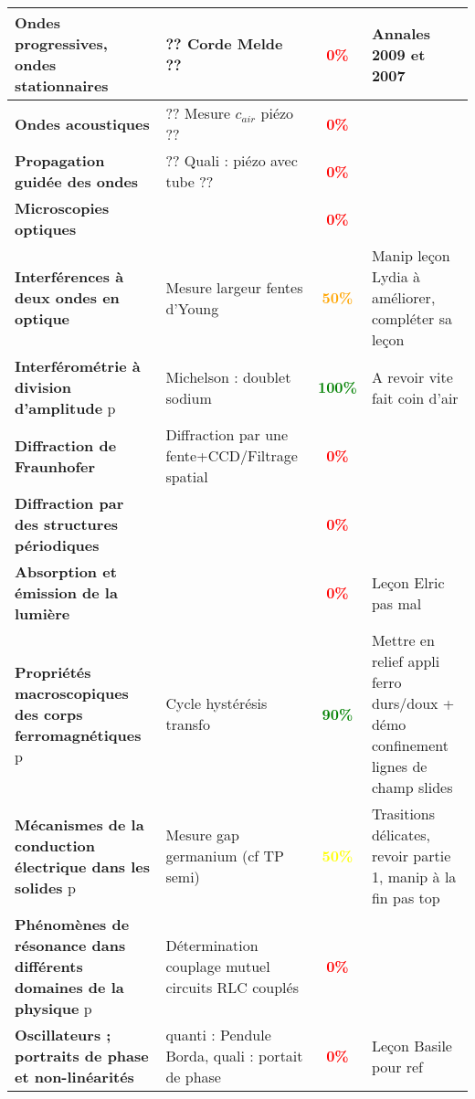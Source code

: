 \begin{changemargin}{-1.5cm}{-0cm}
\begin{center}
\begin{tabularx}{\paperwidth-2cm}{| X | X | c | X |}
\hline
  \textbf{Ondes progressives, ondes stationnaires} & ?? Corde Melde ?? & \textcolor{red}{\textbf{0\%}} & Annales 2009 et 2007 \\
  \hline
  \textbf{Ondes acoustiques} & ?? Mesure $c_{air}$ piézo ?? & \textcolor{red}{\textbf{0\%}} &  \\
  \hline
  \textbf{Propagation guidée des ondes} & ?? Quali : piézo avec tube  ?? & \textcolor{red}{\textbf{0\%}} & \\
  \hline
  \textbf{Microscopies optiques} & & \textcolor{red}{\textbf{0\%}} &  \\
  \hline
  \textbf{Interférences à deux ondes en optique} & Mesure largeur fentes d'Young & \textcolor{orange}{\textbf{50\%}} & Manip leçon Lydia à améliorer, compléter sa leçon \\
  \hline
  \textbf{Interférométrie à division d'amplitude} p\pageref{LP_DivisionAmplitude} & Michelson : doublet sodium & \textcolor{green}{\textbf{100\%}} & A revoir vite fait coin d'air \\
  \hline
  \textbf{Diffraction de Fraunhofer} & Diffraction par une fente+CCD/Filtrage spatial & \textcolor{red}{\textbf{0\%}} &  \\
  \hline
  \textbf{Diffraction par des structures périodiques} &  & \textcolor{red}{\textbf{0\%}} &  \\
  \hline
  \textbf{Absorption et émission de la lumière} &  & \textcolor{red}{\textbf{0\%}} & Leçon Elric pas mal \\
  \hline
  \hline
  \textbf{Propriétés macroscopiques des corps ferromagnétiques } p\pageref{LP_Ferromagnetisme} & Cycle hystérésis transfo & \textcolor{green}{\textbf{90\%}} & Mettre en relief appli ferro durs/doux + démo confinement lignes de champ slides \\
  \hline
  \textbf{Mécanismes de la conduction électrique dans les solides} p\pageref{LP_Conduction} & Mesure gap germanium (cf TP semi) & \textcolor{yellow}{\textbf{50\%}} & Trasitions délicates, revoir partie 1, manip à la fin pas top \\
  \hline
  \textbf{Phénomènes de résonance dans différents domaines de la physique} p\pageref{LP_resonance} & Détermination couplage mutuel circuits RLC couplés & \textcolor{red}{\textbf{0\%}} &  \\
  \hline
  \textbf{Oscillateurs ; portraits de phase et non-linéarités} & quanti : Pendule Borda, quali : portait de phase & \textcolor{red}{\textbf{0\%}} & Leçon Basile pour ref  \\

\end{tabularx}
\end{center}
\end{changemargin}
